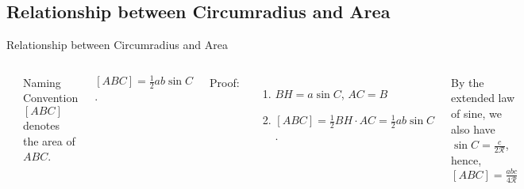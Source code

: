 \documentclass{beamer}
\begin{document}
\subsection{Relationship between Circumradius and Area}
\begin{frame}{Relationship between Circumradius and Area}
	\begin{columns}
		\begin{center}
		\end{center}
		\begin{exampleblock}{Naming Convention}
			$[ABC]$	denotes the area of $ABC$.
		\end{exampleblock}
		\begin{theorem}
			$[ABC] = \frac{1}{2}ab\sin C$.
		\end{theorem}
		Proof:
		\begin{enumerate}
			\item $BH = a\sin C$, $AC=B$
			\item $[ABC] = \frac{1}{2} BH \cdot AC = \frac{1}{2}ab\sin C$.
		\end{enumerate}
		\begin{theorem}
			By the extended law of sine, we also have $\sin C = \frac{c}{2\mathcal{R}}$, hence, $[ABC] = \frac{abc}{4\mathcal{R}}$
		\end{theorem}
	\end{columns}
\end{frame}
\end{document}
